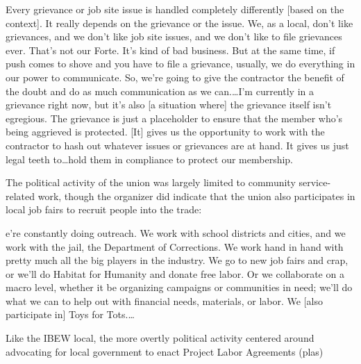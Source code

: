 \documentclass[12pt]{article}
\renewenvironment{quote}
  {\list{}{\leftmargin=\parindent\rightmargin=0pt}%
   \item\relax}
  {\endlist}
\begin{document}
\begin{quote}
Every grievance or job site issue is handled completely differently [based on the context]. It really depends on the grievance or the issue. We, as a local, don't like grievances, and we don't like job site issues, and we don't like to file grievances ever. That's not our Forte. It's kind of bad business. But at the same time, if push comes to shove and you have to file a grievance, usually, we do everything in our power to communicate. So, we're going to give the contractor the benefit of the doubt and do as much communication as we can.\ldots{}I'm currently in a grievance right now, but it's also [a situation where] the grievance itself isn't egregious. The grievance is just a placeholder to ensure that the member who's being aggrieved is protected. [It] gives us the opportunity to work with the contractor to hash out whatever issues or grievances are at hand. It gives us just legal teeth to\ldots{}hold them in compliance to protect our membership.
\end{quote}

The political activity of the union was largely limited to community service-related work, though the organizer did indicate that the union also participates in local job fairs to recruit people into the trade:

\begin{quote}
[W]e're constantly doing outreach. We work with school districts and cities, and we work with the jail, the Department of Corrections. We work hand in hand with pretty much all the big players in the industry. We go to new job fairs and crap, or we'll do Habitat for Humanity and donate free labor. Or we collaborate on a macro level, whether it be organizing campaigns or communities in need; we'll do what we can to help out with financial needs, materials, or labor. We [also participate in] Toys for Tots.\ldots
\end{quote}

Like the IBEW local, the more overtly political activity centered around advocating for local government to enact Project Labor Agreements (\acrshort{pla}s)

\clearpage

\titleformat{\section}{\fontsize{12}{14}\bfseries\centering}{\thesection}{0.5em}{}
\printbibliography[heading=bibintoc]
\end{document}
